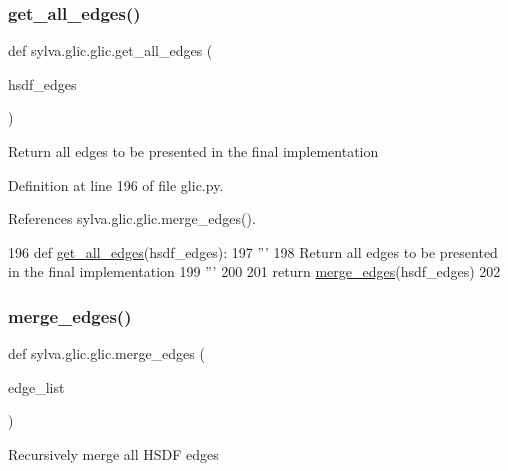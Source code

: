\subsubsection{\texorpdfstring{get\+\_\+all\+\_\+edges()}{get\_all\_edges()}}
{\footnotesize\ttfamily def sylva.\+glic.\+glic.\+get\+\_\+all\+\_\+edges (\begin{DoxyParamCaption}\item[{}]{hsdf\+\_\+edges }\end{DoxyParamCaption})}

\begin{DoxyVerb}  Return all edges to be presented in the final implementation
\end{DoxyVerb}
 

Definition at line 196 of file glic.\+py.



References sylva.\+glic.\+glic.\+merge\+\_\+edges().


\begin{DoxyCode}
196 \textcolor{keyword}{def }\hyperlink{namespacesylva_1_1glic_1_1glic_a113a86d012f0236519ec7ac19e0e4850}{get\_all\_edges}(hsdf\_edges):
197     \textcolor{stringliteral}{'''}
198 \textcolor{stringliteral}{      Return all edges to be presented in the final implementation}
199 \textcolor{stringliteral}{    '''}
200 
201     \textcolor{keywordflow}{return} \hyperlink{namespacesylva_1_1glic_1_1glic_aaac34d7c86749beb842e5be3f547d1ec}{merge\_edges}(hsdf\_edges)
202 
\end{DoxyCode}
\mbox{\label{namespacesylva_1_1glic_1_1glic_aaac34d7c86749beb842e5be3f547d1ec}} 
\subsubsection{\texorpdfstring{merge\+\_\+edges()}{merge\_edges()}}
{\footnotesize\ttfamily def sylva.\+glic.\+glic.\+merge\+\_\+edges (\begin{DoxyParamCaption}\item[{}]{edge\+\_\+list }\end{DoxyParamCaption})}

\begin{DoxyVerb}Recursively merge all HSDF edges \end{DoxyVerb}
 

